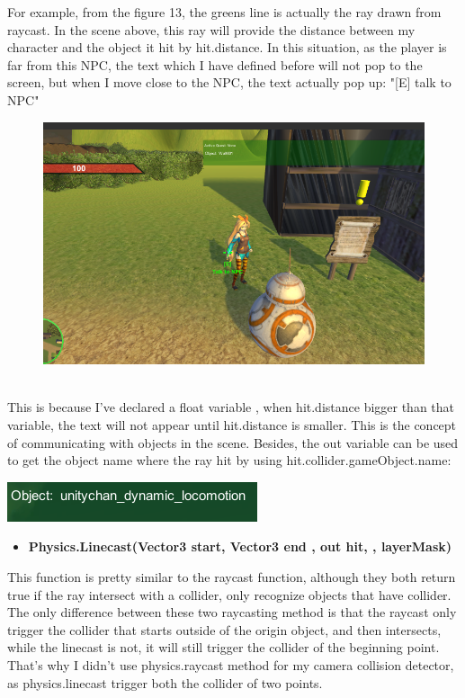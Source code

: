 \documentclass[a4paper, 13pt]{extarticle}
\begin{document}
 	For example, from the figure 13, the greens line is actually the ray drawn from raycast. In the scene above, this ray will provide the distance between my character and the object it hit by hit.distance. In this situation, as the player is far from this NPC, the text which I have defined before will not pop to the screen, but when I move close to the NPC, the text actually pop up: "[E] talk to NPC"
 	\begin{figure}[h]
 		
 			\begin{minipage}{1\textwidth}
 				\centering
 				\includegraphics[width=0.5\linewidth]{intructions/text_popup.png}
 				\centering
 				\label{fig:test15}
 			\end{minipage}
 		\end{figure}
 	\\[0.05cm]
 	This is because I've declared a float variable , when hit.distance bigger than that variable, the text will not appear until hit.distance is smaller. This is the concept of communicating with objects in the scene. Besides, the out variable can be used to get the object name where the ray hit by using hit.collider.gameObject.name: 	
 	\noindent\begin{minipage}{0.3\textwidth}
 		\includegraphics[width=\linewidth]{intructions/objectname.png}
 	\end{minipage}
 	\newpage
 	\begin{itemize}
 		\item \bfseries Physics.Linecast(Vector3 start,  Vector3 end , out hit, , layerMask)	 	
 	\end{itemize}
 		This function is pretty similar to the raycast function, although they both return true if the ray intersect with a collider, only recognize objects that have collider. The only difference between these two raycasting method is that the raycast only trigger the collider that starts outside of the origin object, and then intersects,  while the linecast is not, it will still trigger the collider of the beginning point. That's why I didn't use physics.raycast method for my camera collision detector, as physics.linecast trigger both the collider of two points.
 
\end{document}
